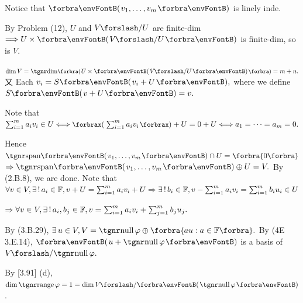 \documentclass[a4paper, 11pt, UTF8]{article}
\begin{document}
\begin{large}
Notice that $\Par{v_1,\dots,v_m}$ is linely inde.\par\quad
By Problem (12), $U$ and $V\mySlash U$ are finite-dim $\Longrightarrow U\times\Par{V\mySlash U}$ is finite-dim, so is $V$.\par\quad
$\dim V=\Dim\BigPar{U\times\Par{V\mySlash U}}=m+n.$ 又 Each $v_i=S\Par{v_i+U},$ where we define $S\Par{v+U}=v.$\par\quad
Note that $\sum_{i=1}^m a_i v_i\in U\Longleftrightarrow\XPar{\sum_{i=1}^m a_i v_i}+U=0+U\Longleftrightarrow a_1=\dots=a_m=0.$\vspace{4pt}\par\quad
Hence $\Span{v_1,\dots,v_m}\cap U=\zeroSubs$
$\Rightarrow\Span{v_1,\dots,v_m}\oplus U=V.$ By (2.B.8), we are done.\PfEnd\vspace{8pt}\quad
\Or Note that $\forall v\in V,\exists\,!\,a_i\in{\mathbb{F}},v+U=\sum_{i=1}^m a_i v_i+U\Rightarrow\exists\,!\,b_i\in{\mathbb{F}},v-\sum_{i=1}^m a_i v_i=\sum_{i=1}^m b_i u_i\in U$\vspace{4pt}\par\quad
{} $\Rightarrow \forall v\in V,\exists\,!\,a_i,b_j\in{\mathbb{F}},v=\sum_{i=1}^m a_i v_i+\sum_{j=1}^m b_j u_j.$\PfEnd
\SepLine

\par\quad
By (3.B.29), $\exists\,u\in V,V=\null\varphi\oplus\Bra{au:a\in\Fbb}.$ By (4E 3.E.14), $\Par{u+\null\varphi}$ is a basis of $V\mySlash \null\varphi.$\par\quad
\Or By [3.91] (d), $\dim\range\varphi=1=\dim V\mySlash \Par{\null \varphi}$.\PfEnd
\SepLine


\end{large}
\end{document}
